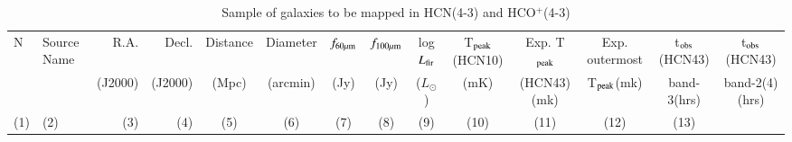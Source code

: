 \documentclass[legal,11pt]{article}
\begin{document}
\begin{table}
\caption{Sample of galaxies to be mapped in HCN(4-3) and HCO$^+$(4-3)}
\label{tbl:sample}
\centering
\scriptsize
\addtolength{\tabcolsep}{-4.5pt}



\begin{threeparttable}[b]
\begin{tabular}{llrrcccccccccc}
\hline
\hline

N & Source Name & R.A. & Decl. & Distance & Diameter & $f_{\rm 60\mu m}$ & $f_{\rm 100\mu m}$ & log$L_{\rm fir}$ & T$_{\rm peak}$(HCN10) & Exp. T$_{\rm peak}$ & Exp. outermost & t$_{\rm obs}$(HCN43) & t$_{\rm obs}$(HCN43) \\

  &  & (J2000) & (J2000) & (Mpc) & (arcmin) & (Jy) & (Jy) & ($L_\odot$) & (mK) & (HCN43)(mk) & T$_{\rm peak}$(mk) & band-3(hrs) & band-2(4)(hrs) \\
 
 (1) & (2)  & (3) & (4) & (5) & (6) & (7) & (8) & (9) & (10) & (11) & (12) & (13)  \\

\hline


\end{tabular}
\end{threeparttable}
\end{table}
\end{document}
